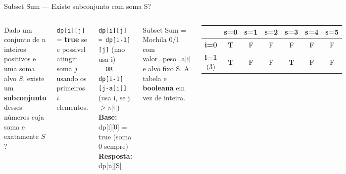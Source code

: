 \documentclass[aspectratio=169,10pt]{beamer}
\newcommand{\cDPT}[1]{%
  \cellcolor{cellTrue}\footnotesize\bfseries #1}
\newcommand{\cDPF}[1]{%
  \cellcolor{cellFalse}\footnotesize #1}
\begin{document}
\begin{frame}[shrink=3]{Subset Sum --- Existe subconjunto com soma S?}
  \begin{columns}[c]
      \begin{tcolorbox}[caixaAzul,title={Enunciado}]
        \small
        Dado um conjunto de $n$ inteiros positivos
        e uma soma alvo $S$, existe um
        \textbf{subconjunto} desses números cuja
        soma e exatamente $S$?
      \end{tcolorbox}
      \vspace{0.08cm}
      \begin{tcolorbox}[caixaDP,title={Estado Booleano}]
        \footnotesize
        \texttt{dp[i][j]} = \textbf{true} se e possivel
        atingir soma $j$ usando os primeiros $i$ elementos.
      \end{tcolorbox}
      \vspace{0.08cm}
      \begin{tcolorbox}[caixaTeal,title={Transição}]
        \footnotesize
        \texttt{dp[i][j] = dp[i-1][j]} (nao usa i)\\
        \texttt{\ \ OR dp[i-1][j-a[i]]} (usa i, se j$\geq$a[i])\\[3pt]
        \textbf{Base:} dp[i][0] = true (soma 0 sempre)\\
        \textbf{Resposta:} dp[n][S]
      \end{tcolorbox}
      \vspace{0.08cm}
      \begin{tcolorbox}[caixaVerde,title={Relação com Mochila}]
        \footnotesize
        Subset Sum = Mochila 0/1 com valor=peso=a[i] e alvo fixo S.
        A tabela e \textbf{booleana} em vez de inteira.
      \end{tcolorbox}
      \begin{tcolorbox}[caixaAzul,title={Conjunto \{3,1,4,2\}, alvo S=5}]
        \centering\footnotesize
        \setlength{\tabcolsep}{2pt}
        \begin{tabular}{c|cccccc}
          \toprule
          \rowcolor{gemaBlue!15}
          & \textbf{s=0}&\textbf{s=1}&\textbf{s=2}&\textbf{s=3}&\textbf{s=4}&\textbf{s=5}\\
          \midrule
          \textbf{i=0} & \cDPT{T} & \cDPF{F} & \cDPF{F} & \cDPF{F} & \cDPF{F} & \cDPF{F}\\
          \textbf{i=1} (3) & \cDPT{T} & \cDPF{F} & \cDPF{F} & \cDPT{T} & \cDPF{F} & \cDPF{F}\\

\end{tabular}
\end{tcolorbox}
\end{columns}
\end{frame}
\end{document}

